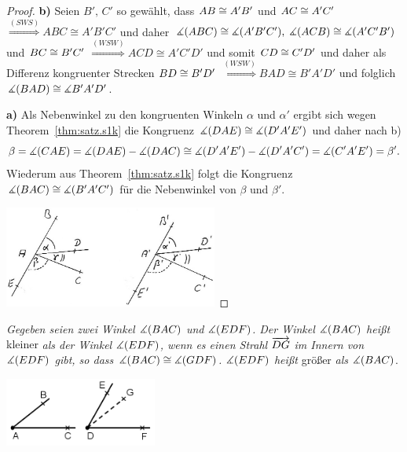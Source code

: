 \begin{proof}
{\bf b)}  Seien $B',\,C'$ so gew\"{a}hlt, dass
${AB}\cong{A'B'}$ und ${AC}\cong{A'C'}$
$\stackrel{(SWS)}{\Longrightarrow} ABC \cong A'B'C'$ und
daher $\mbox{$\measuredangle$}(ABC)\cong\mbox{$\measuredangle$}(A'B'C'),\;\mbox{$\measuredangle$}(ACB)\cong\mbox{$\measuredangle$}(A'C'B')$ und
${BC}\cong{B'C'}$
$\stackrel{(WSW)}{\Longrightarrow} ACD \cong A'C'D'$ und
somit ${CD}\cong{C'D'}$ und daher als Differenz kongruenter
Strecken ${BD}\cong{B'D'}$
$\stackrel{(WSW)}{\Longrightarrow} BAD \cong B'A'D'$ und
folglich $\mbox{$\measuredangle$}(BAD)\cong\mbox{$\measuredangle$}{B'A'D'}$.


{\bf a)}  Als Nebenwinkel zu den kongruenten Winkeln $\alpha$ und
$\alpha'$ ergibt sich wegen Theorem~\ref{thm:satz.s1k} die Kongruenz
$\mbox{$\measuredangle$}(DAE)\cong\mbox{$\measuredangle$}(D'A'E')$ und daher nach b)
\[\beta=\mbox{$\measuredangle$}(CAE)=\mbox{$\measuredangle$}(DAE)-\mbox{$\measuredangle$}(DAC)\cong\mbox{$\measuredangle$}(D'A'E')-\mbox{$\measuredangle$}(D'A'C')=\mbox{$\measuredangle$}(C'A'E')=\beta'.\]
Wiederum aus Theorem~\ref{thm:satz.s1k} folgt die Kongruenz
$\mbox{$\measuredangle$}(BAC)\cong\mbox{$\measuredangle$}(B'A'C')$ f\"{u}r die Nebenwinkel von $\beta$ und
$\beta'$.


\centerline{\includegraphics[width=7cm]{BILDER/1-2-15a-Winkel.jpg}}


\end{proof}



\begin{defi} \emph{Gegeben seien zwei Winkel $\mbox{$\measuredangle$}(BAC)$ und
$\mbox{$\measuredangle$}(EDF)$. Der Winkel $\mbox{$\measuredangle$}(BAC)$ hei{\ss}t} kleiner \emph{als der
Winkel $\mbox{$\measuredangle$}(EDF)$, wenn es einen Strahl $\mbox{${\overrightarrow{DG}}$}$ im Innern von
$\mbox{$\measuredangle$}(EDF)$ gibt, so dass $\mbox{$\measuredangle$}(BAC)\cong\mbox{$\measuredangle$}(GDF)$. $\mbox{$\measuredangle$}(EDF)$
hei{\ss}t} gr\"{o}{\ss}er \emph{als} $\mbox{$\measuredangle$}(BAC)$.
\end{defi}


\centerline{\includegraphics[width=5cm]{BILDER/1-2-16-Winkel.png}}




